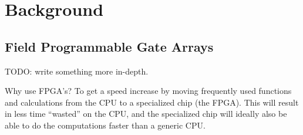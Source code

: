 \documentclass[11pt]{article}
\author{John Doe}
\date{\today}
\title{}
\begin{document}
\tableofcontents

\section{Background}
\label{sec:org1ba87d8}

\subsection{Field Programmable Gate Arrays}
\label{sec:org719b17c}
TODO: write something more in-depth.

Why use FPGA's? To get a speed increase by moving frequently used functions and calculations from the CPU to a specialized chip (the FPGA).
This will result in less time ``wasted'' on the CPU, and the specialized chip will ideally also be able to do the computations faster than a generic CPU.
\end{document}
